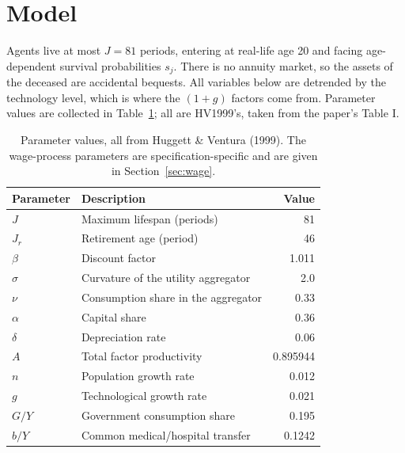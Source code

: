 \documentclass[11pt,fleqn]{article}
\begin{document}
\section{Model}\label{sec:model}

Agents live at most $J=81$ periods, entering at real-life age 20 and facing age-dependent
survival probabilities $s_j$. There is no annuity market, so the assets of the deceased are
accidental bequests. All variables below are detrended by the technology level, which is
where the $(1+g)$ factors come from. Parameter values are collected in Table~\ref{tab:params};
all are HV1999's, taken from the paper's Table I.

\begin{table}[htp]
\begin{center}
\begin{tabular}{llr}
\hline
Parameter & Description & Value \\
\hline
$J$        & Maximum lifespan (periods)            & 81 \\
$J_r$      & Retirement age (period)               & 46 \\
$\beta$    & Discount factor                       & 1.011 \\
$\sigma$   & Curvature of the utility aggregator   & 2.0 \\
$\nu$      & Consumption share in the aggregator   & 0.33 \\
$\alpha$   & Capital share                         & 0.36 \\
$\delta$   & Depreciation rate                     & 0.06 \\
$A$        & Total factor productivity             & 0.895944 \\
$n$        & Population growth rate                & 0.012 \\
$g$        & Technological growth rate             & 0.021 \\
$G/Y$      & Government consumption share          & 0.195 \\
$b/Y$      & Common medical/hospital transfer      & 0.1242 \\
\hline
\end{tabular}
\end{center}
\caption{Parameter values, all from Huggett \& Ventura (1999). The wage-process parameters
are specification-specific and are given in Section~\ref{sec:wage}.}
\label{tab:params}
\end{table}
\end{document}
